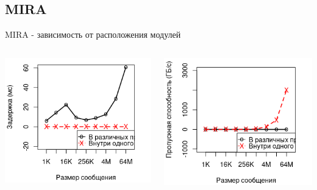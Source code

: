 \subsection{MIRA}
\begin{frame}{MIRA - зависимость от расположения модулей}
\begin{columns}[onlytextwidth]
	\begin{column}{0.45\textwidth}
		\includegraphics[width=\textwidth]{img/mira/mira_res_i_o_ml.png}
	\end{column}
	\begin{column}{0.45\textwidth}
		\includegraphics[width=\textwidth]{img/mira/mira_res_i_o_bps.png}
	\end{column}
\end{columns}
\end{frame}

